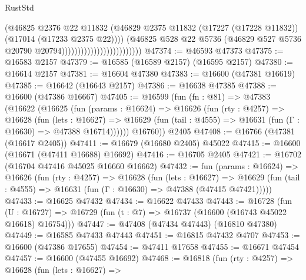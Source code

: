 \begin{lexlean}{RustStd}
\begin{coremodule}
                                                  (@46825
                                                    @2376
                                                    @22
                                                    @11832
                                                    (@46829
                                                      @2375
                                                      @11832
                                                      (@17227 (@17228 @11832))
                                                      (@17014 (@17233 @2375 @22))))
                                                  (@46825
                                                    @528
                                                    @22
                                                    @5736
                                                    (@46829
                                                      @527
                                                      @5736
                                                      @20790
                                                      @20794)))))))))))))))))))))))))
@47374 := @46593 @47373
@47375 := @16583 @2157
@47379 := @16585 (@16589 @2157) (@16595 @2157)
@47380 := @16614 @2157
@47381 := @16604 @47380
@47383 := @16600 (@47381 @16619)
@47385 := @16642 (@16643 @2157)
@47386 := @16638 @47385
@47388 := @16600 (@47386 @16667)
@47405 := @16599
    (fun (fn : @81) =>
    @47383
      (@16622
        (@16625
          (fun (params : @16624) =>
          @16626
            (fun (rty : @4257) =>
            @16628
              (fun (lets : @16627) =>
              @16629 (fun (tail : @4555) => @16631 (fun (Γ : @16630) => @47388 @16714))))))
        @16760))
    @2405
@47408 := @16766 (@47381 (@16617 @2405))
@47411 := @16679 (@16680 @2405) @45022
@47415 := @16600 (@16671 (@47411 @16688) @16692)
@47416 := @16705 @2405
@47421 := @16702 (@16704 @47416 @45025 @16660 @16662)
@47432 := fun (params : @16624) =>
  @16626
    (fun (rty : @4257) =>
    @16628
      (fun (lets : @16627) =>
      @16629 (fun (tail : @4555) => @16631 (fun (Γ : @16630) => @47388 (@47415 @47421)))))
@47433 := @16625 @47432
@47434 := @16622 @47433
@47443 := @16728
    (fun (U : @16727) => @16729 (fun (t : @7) => @16737 (@16600 (@16743 @45022 @16618) @16754)))
@47447 := @47408 (@47434 @47443) (@16810 @47380)
@47449 := @16585 @47433 @47443
@47451 := @16815 @47432 @4707
@47453 := @16600 (@47386 @17655)
@47454 := @47411 @17658
@47455 := @16671 @47454
@47457 := @16600 (@47455 @16692)
@47468 := @16818
    (fun (rty : @4257) =>
    @16628
      (fun (lets : @16627) =>

\end{coremodule}
\end{lexlean}
